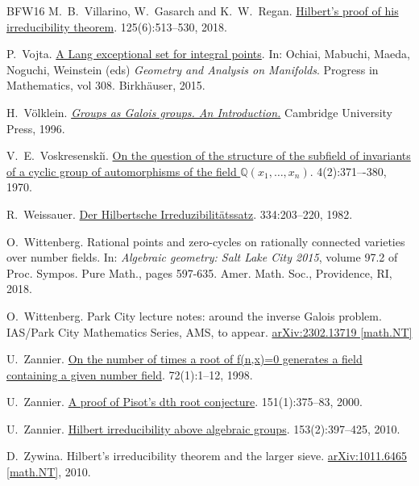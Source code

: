 \documentclass[10pt,a4paper]{amsart}
\theoremstyle{plain}
\theoremstyle{remark}
\numberwithin{theorem}{section}
\begin{document}
\begin{thebibliography}{BFW16}
M.~B.~Villarino, W.~Gasarch and K.~W.~Regan.
\newblock \href{https://doi.org/10.1080/00029890.2018.1448181}{Hilbert’s proof of his irreducibility theorem}.
 125(6):513--530, 2018.

P.~Vojta. 
\newblock \href{https://doi.org/10.1007/978-3-319-11523-8_8}{A Lang exceptional set for integral points}.
\newblock In: Ochiai, Mabuchi, Maeda,  Noguchi, Weinstein (eds) {\em Geometry and Analysis on Manifolds}. Progress in Mathematics, vol 308. Birkhäuser, 2015. 

H.~Völklein.
\newblock \href{https://doi.org/10.1017/CBO9780511471117}{\em Groups as Galois groups. An Introduction.}
\newblock Cambridge University Press, 1996.


V.~E.~Voskresenski\u{\i}.
\newblock \href{https://doi.org/10.1070/IM1970v004n02ABEH000910}{On the question of the structure of the subfield of invariants of a cyclic group of automorphisms of the field $\mathbb{Q}(x_1,…,x_n)$}.
 4(2):371–-380, 1970. 

R.~Weissauer.
\newblock \href{https://eudml.org/doc/152457}{Der Hilbertsche Irreduzibilitätssatz}.
 334:203--220, 1982.

O.~Wittenberg.
\newblock  Rational points and zero-cycles on rationally connected varieties over number fields.
\newblock In: {\em Algebraic geometry: Salt Lake City 2015}, volume 97.2 of Proc. Sympos. Pure Math., pages 597-635. Amer. Math. Soc., Providence, RI, 2018.

O.~Wittenberg. 
\newblock Park City lecture notes: around the inverse Galois problem.
\newblock IAS/Park City Mathematics Series, AMS, to appear.
\href{https://doi.org/10.48550/arXiv.2302.13719}{arXiv:2302.13719 [math.NT]}

U.~Zannier.
\newblock \href{https://doi.org/10.1006/jnth.1998.2243}{On the number of times a root of f(n,x)=0 generates a field containing a given number field}.
 72(1):1--12, 1998.

U.~Zannier.
\newblock \href{https://doi.org/10.2307/121122}{A proof of Pisot’s dth root conjecture}. 
  151(1):375--83, 2000.

U.~Zannier.
\newblock \href{https://doi.org/10.1215/00127094-2010-027}{Hilbert irreducibility above algebraic groups}.
 153(2):397--425, 2010.

D.~Zywina.
\newblock Hilbert's irreducibility theorem and the larger sieve.
\newblock \href{https://doi.org/10.48550/arXiv.1011.6465}{arXiv:1011.6465 [math.NT]}, 2010.

\end{thebibliography}
\end{document}
